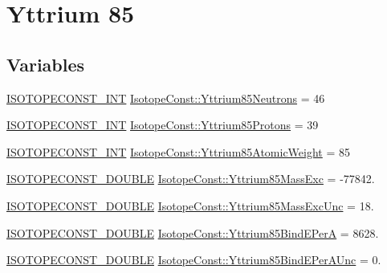 \hypertarget{group___isotope_const-_yttrium-_y85}{}\section{Yttrium 85}
\label{group___isotope_const-_yttrium-_y85}
\subsection*{Variables}
\begin{DoxyCompactItemize}
\item 
\mbox{\hyperlink{group___isotope_const-_macros_ga5f18360b3e99483a35c32d789e62621c}{I\+S\+O\+T\+O\+P\+E\+C\+O\+N\+S\+T\+\_\+\+I\+NT}} \mbox{\hyperlink{group___isotope_const-_yttrium-_y85_gaaba0b907df5cdcee24ea61feae6bdb18}{Isotope\+Const\+::\+Yttrium85\+Neutrons}} = 46
\item 
\mbox{\hyperlink{group___isotope_const-_macros_ga5f18360b3e99483a35c32d789e62621c}{I\+S\+O\+T\+O\+P\+E\+C\+O\+N\+S\+T\+\_\+\+I\+NT}} \mbox{\hyperlink{group___isotope_const-_yttrium-_y85_gadbf5e0982cf751bc96443af5cf384a85}{Isotope\+Const\+::\+Yttrium85\+Protons}} = 39
\item 
\mbox{\hyperlink{group___isotope_const-_macros_ga5f18360b3e99483a35c32d789e62621c}{I\+S\+O\+T\+O\+P\+E\+C\+O\+N\+S\+T\+\_\+\+I\+NT}} \mbox{\hyperlink{group___isotope_const-_yttrium-_y85_ga638c356334e8ebb6c13b842e583c23ab}{Isotope\+Const\+::\+Yttrium85\+Atomic\+Weight}} = 85
\item 
\mbox{\hyperlink{group___isotope_const-_macros_ga8f45a7272ce02c0b4c65c44636ed719a}{I\+S\+O\+T\+O\+P\+E\+C\+O\+N\+S\+T\+\_\+\+D\+O\+U\+B\+LE}} \mbox{\hyperlink{group___isotope_const-_yttrium-_y85_ga34d7069902fccfeeb81122bb821222ca}{Isotope\+Const\+::\+Yttrium85\+Mass\+Exc}} = -\/77842.
\item 
\mbox{\hyperlink{group___isotope_const-_macros_ga8f45a7272ce02c0b4c65c44636ed719a}{I\+S\+O\+T\+O\+P\+E\+C\+O\+N\+S\+T\+\_\+\+D\+O\+U\+B\+LE}} \mbox{\hyperlink{group___isotope_const-_yttrium-_y85_gac79d5bb05b5db5f0e2742b81d98200b4}{Isotope\+Const\+::\+Yttrium85\+Mass\+Exc\+Unc}} = 18.
\item 
\mbox{\hyperlink{group___isotope_const-_macros_ga8f45a7272ce02c0b4c65c44636ed719a}{I\+S\+O\+T\+O\+P\+E\+C\+O\+N\+S\+T\+\_\+\+D\+O\+U\+B\+LE}} \mbox{\hyperlink{group___isotope_const-_yttrium-_y85_ga0af82888704a463ada35e63940f451ff}{Isotope\+Const\+::\+Yttrium85\+Bind\+E\+PerA}} = 8628.
\item 
\mbox{\hyperlink{group___isotope_const-_macros_ga8f45a7272ce02c0b4c65c44636ed719a}{I\+S\+O\+T\+O\+P\+E\+C\+O\+N\+S\+T\+\_\+\+D\+O\+U\+B\+LE}} \mbox{\hyperlink{group___isotope_const-_yttrium-_y85_ga87e829637dc3ebc67c40d0bce546f84a}{Isotope\+Const\+::\+Yttrium85\+Bind\+E\+Per\+A\+Unc}} = 0.

\end{DoxyCompactItemize}
